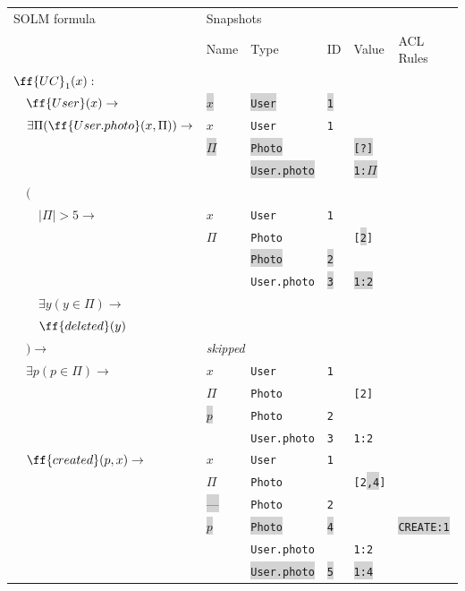 \documentclass[12pt,oneside,letterpaper]{article}
\begin{document}
\def\chng#1{\colorbox{lightgray}{#1}}
\begin{tabular}[t]{l|lllll}
SOLM formula & \multicolumn{5}{l}{Snapshots} \\
& Name & Type & ID & Value & ACL Rules \\
\hline

$\ff{UC}_1(x) : $ \\
$\quad \ff{User}(x) \to$
& \chng{$x$} & \chng{\texttt{User}} & \chng{\texttt{1}} \\

\hline
$\quad \exists \Pi(\ff{User.photo}(x, \Pi)) \to$
& $x$ & \texttt{User} & \texttt{1} \\
& \chng{$\Pi$} & \chng{\texttt{Photo}} & & \chng{\texttt{[?]}} \\
&  & \chng{\texttt{User.photo}} & & \chng{\texttt{1:$\Pi$}} \\

\hline
$\quad ($ \\
$\quad\quad |\Pi| > 5 \to$
& $x$ & \texttt{User} & \texttt{1} \\
& $\Pi$ & \texttt{Photo} & & \texttt{[\chng{2}]} \\
&  & \chng{\texttt{Photo}} & \chng{\texttt{2}} \\
& & \texttt{User.photo} & \texttt{\chng{3}} & \chng{\texttt{1:2}} \\

\hline
$\quad\quad \exists y(y \in \Pi) \to$ \\
$\quad\quad \ff{deleted}(y) $ \\
$\quad ) \to$
& \multicolumn{4}{l}{\textit{skipped}} \\

\hline
$\quad \exists p(p \in \Pi) \to$
& $x$ & \texttt{User} & \texttt{1} \\
& $\Pi$ & \texttt{Photo} & & \texttt{[2]} \\
& \chng{$p$} & \texttt{Photo} & \texttt{2} \\
&  & \texttt{User.photo} & \texttt{3} & \texttt{1:2} \\

\hline
$\quad \ff{created}(p, x) \to$
& $x$ & \texttt{User} & \texttt{1} \\
& $\Pi$ & \texttt{Photo} & & \texttt{[2\chng{,4}]} \\
& \chng{---} & \texttt{Photo} & \texttt{2} \\
& \chng{$p$} & \chng{\texttt{Photo}} & \chng{\texttt{4}} & & \chng{\texttt{CREATE:1}} \\
& & \texttt{User.photo} & & \texttt{1:2} \\
& & \chng{\texttt{User.photo}} & \chng{\texttt{5}} & \chng{\texttt{1:4}} \\


\end{tabular}
\end{document}
